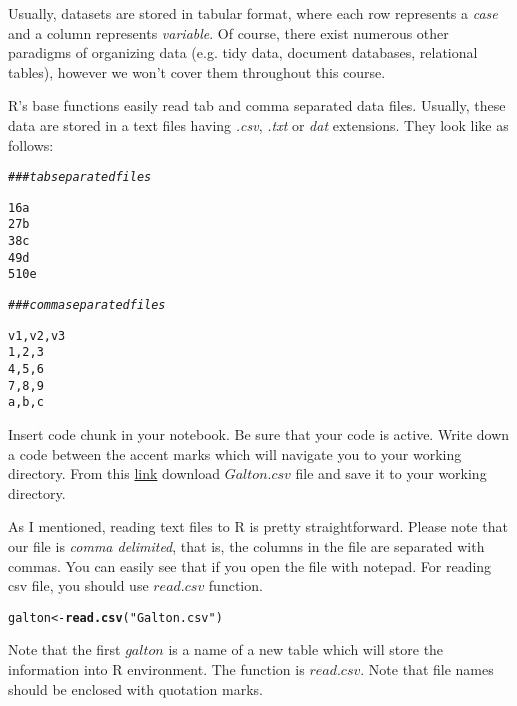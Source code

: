 \documentclass{article}\usepackage[]{graphicx}\usepackage[]{color}
\makeatletter
\newcommand{\hlstr}[1]{\textcolor[rgb]{0.192,0.494,0.8}{#1}}%
\newcommand{\hlcom}[1]{\textcolor[rgb]{0.678,0.584,0.686}{\textit{#1}}}%
\newcommand{\hlstd}[1]{\textcolor[rgb]{0.345,0.345,0.345}{#1}}%
\newcommand{\hlkwb}[1]{\textcolor[rgb]{0.69,0.353,0.396}{#1}}%
\newcommand{\hlkwd}[1]{\textcolor[rgb]{0.737,0.353,0.396}{\textbf{#1}}}%
\newenvironment{kframe}{%
 \def\at@end@of@kframe{}%
 \ifinner\ifhmode%
  \def\at@end@of@kframe{\end{minipage}}%
  \begin{minipage}{\columnwidth}%
 \fi\fi%
 \def\FrameCommand##1{\hskip\@totalleftmargin \hskip-\fboxsep
 \colorbox{shadecolor}{##1}\hskip-\fboxsep
     \hskip-\linewidth \hskip-\@totalleftmargin \hskip\columnwidth}%
 \MakeFramed {\advance\hsize-\width
   \@totalleftmargin\z@ \linewidth\hsize
   \@setminipage}}%
 {\par\unskip\endMakeFramed%
 \at@end@of@kframe}
\newenvironment{knitrout}{}{} %
\makeatother
\begin{document}
Usually, datasets are stored in tabular format, where each row represents a \emph{case} and a column represents \emph{variable}. Of course, there exist numerous other paradigms of organizing data (e.g. tidy data, document databases, relational tables), however we won't cover them throughout this course.

R's base functions easily read tab and comma separated data files. Usually, these data are stored in a text files having \emph{.csv}, \emph{.txt} or \emph{dat} extensions. They look like as follows:

\begin{knitrout}
\color{fgcolor}\begin{kframe}
\begin{alltt}
\hlcom{### tab separated files}

1   6   a
2   7   b
3   8   c
4   9   d
5   10  e

\hlcom{### comma separated files}

v1,v2,v3
1,2,3
4,5,6
7,8,9
a,b,c
\end{alltt}
\end{kframe}
\end{knitrout}


Insert code chunk in your notebook. Be sure that your code is active. Write down a code between the accent marks which will navigate you to your working directory. From this \href{https://www.dropbox.com/s/yfmdhohpp31utwt/Galton.csv?dl=0}{link} download $Galton.csv$ file and save it to your working directory.

As I mentioned, reading text files to R is pretty straightforward. Please note that our file is \emph{comma delimited}, that is, the columns in the file are separated with commas. You can easily see that if you open the file with notepad. For reading csv file, you should use $read.csv$ function.

\begin{knitrout}
\color{fgcolor}\begin{kframe}
\begin{alltt}
\hlstd{galton} \hlkwb{<-} \hlkwd{read.csv}\hlstd{(}\hlstr{"Galton.csv"}\hlstd{)}
\end{alltt}
\end{kframe}
\end{knitrout}

Note that the first $galton$ is a name of a new table which will store the information into R environment. The function is $read.csv$. Note that file names should be enclosed with quotation marks.
\end{document}
